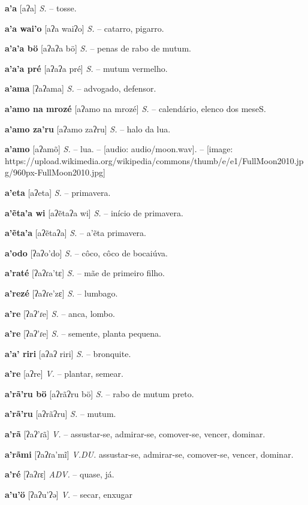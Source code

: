 
\textbf{a'a} [aʔa] \textit{S.} -- tosse.

\textbf{a'a wai'o} [aʔa waiʔo] \textit{S.} -- catarro, pigarro.

\textbf{a'a'a bö} [aʔaʔa bö] \textit{S.} -- penas de rabo de mutum.

\textbf{a'a'a pré} [aʔaʔa pré] \textit{S.} -- mutum vermelho.

\textbf{a'ama} [ʔaʔama] \textit{S.} -- advogado, defensor.

\textbf{a'amo na mrozé} [aʔamo na mrozé] \textit{S.} -- calendário, elenco dos meseS.

\textbf{a'amo za'ru} [aʔamo zaʔru] \textit{S.} -- halo da lua.

\textbf{a'amo} [aʔamõ] \textit{S.} -- lua. -- [audio: audio/moon.wav]{\faHeadphones}. -- [image: https://upload.wikimedia.org/wikipedia/commons/thumb/e/e1/FullMoon2010.jpg/960px-FullMoon2010.jpg]

\textbf{a'eta} [aʔeta] \textit{S.} -- primavera.

\textbf{a'ẽta'a wi} [aʔẽtaʔa wi] \textit{S.} -- início de primavera.

\textbf{a'ẽta'a} [aʔẽtaʔa] \textit{S.} -- a'ẽta primavera.

\textbf{a'odo} [ʔaʔo'do] \textit{S.} -- côco, côco de bocaiúva.

\textbf{a'raté} [ʔaʔɾa'tɛ] \textit{S.} -- mãe de primeiro filho.

\textbf{a'rezé} [ʔaʔɾe'zɛ] \textit{S.} -- lumbago.

\textbf{a're} [ʔaʔ'ɾe] \textit{S.} -- anca, lombo.

\textbf{a're} [ʔaʔ'ɾe] \textit{S.} -- semente, planta pequena.

\textbf{a'a' riri} [aʔaʔ riri] \textit{S.} -- bronquite.

\textbf{a're} [aʔre] \textit{V.} -- plantar, semear.

\textbf{a'rã'ru bö} [aʔrãʔru bö] \textit{S.} -- rabo de mutum preto.

\textbf{a'rã'ru} [aʔrãʔru] \textit{S.} -- mutum.

\textbf{a'rã} [ʔaʔ'ɾã] \textit{V.} -- assustar-se, admirar-se, comover-se, vencer, dominar.

\textbf{a'rãmi} [ʔaʔɾa'mĩ] \textit{V.DU.} assustar-se, admirar-se, comover-se, vencer, dominar.

\textbf{a'ré} [ʔaʔɾɛ] \textit{ADV.} -- quase, já.

\textbf{a'u'ö} [ʔaʔu'ʔə] \textit{V.} -- secar, enxugar

